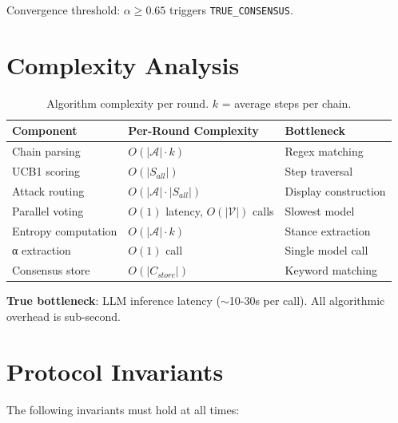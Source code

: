 \documentclass[11pt,a4paper]{article}
\begin{document}
Convergence threshold: $\alpha \geq 0.65$ triggers \texttt{TRUE\_CONSENSUS}.

\section{Complexity Analysis}

\begin{table}[h]
\centering
\begin{tabular}{lll}
\toprule
\textbf{Component} & \textbf{Per-Round Complexity} & \textbf{Bottleneck} \\
\midrule
Chain parsing & $O(|\mathcal{A}| \cdot k)$ & Regex matching \\
UCB1 scoring & $O(|S_{all}|)$ & Step traversal \\
Attack routing & $O(|\mathcal{A}| \cdot |S_{all}|)$ & Display construction \\
Parallel voting & $O(1)$ latency, $O(|\mathcal{V}|)$ calls & Slowest model \\
Entropy computation & $O(|\mathcal{A}| \cdot k)$ & Stance extraction \\
α extraction & $O(1)$ call & Single model call \\
Consensus store & $O(|C_{store}|)$ & Keyword matching \\
\bottomrule
\end{tabular}
\caption{Algorithm complexity per round. $k$ = average steps per chain.}
\end{table}

\textbf{True bottleneck}: LLM inference latency ($\sim$10-30s per call). All algorithmic overhead is sub-second.

\section{Protocol Invariants}

The following invariants must hold at all times:
\end{document}

